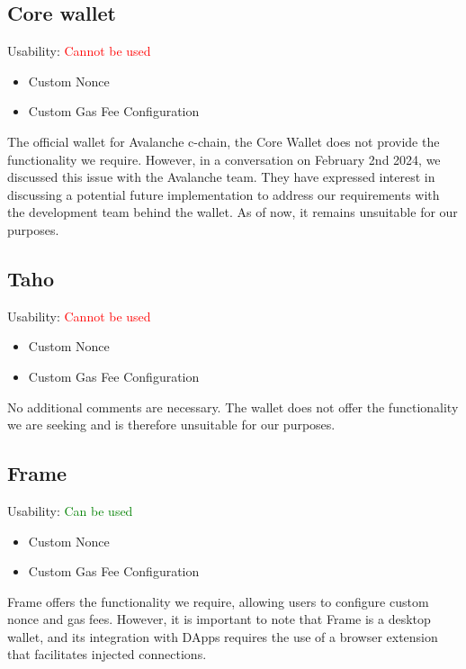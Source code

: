 \documentclass[fleqn,10pt]{olplainarticle}
\newcommand{\cmark}{\ding{51}}%
\newcommand{\xmark}{\ding{55}}%
\begin{document}
\subsection{Core wallet}
Usability: \textcolor{red}{Cannot be used}
\begin{itemize}[noitemsep, nolistsep]
	\item [\textcolor{red}{\xmark}] Custom Nonce
	\item [\textcolor{red}{\xmark}] Custom Gas Fee Configuration
\end{itemize}
The official wallet for Avalanche c-chain, the Core Wallet does not provide the functionality we require. However, in a conversation on February 2nd 2024, we discussed this issue with the Avalanche team. They have expressed interest in discussing a potential future implementation to address our requirements with the development team behind the wallet. As of now, it remains unsuitable for our purposes.

\subsection{Taho}
Usability: \textcolor{red}{Cannot be used}
\begin{itemize}[noitemsep, nolistsep]
	\item [\textcolor{red}{\xmark}] Custom Nonce
	\item [\textcolor{red}{\xmark}] Custom Gas Fee Configuration
\end{itemize}
No additional comments are necessary. The wallet does not offer the functionality we are seeking and is therefore unsuitable for our purposes.

\subsection{Frame}
Usability: \textcolor{green}{Can be used}
\begin{itemize}[noitemsep, nolistsep]
	\item [\textcolor{green}{\cmark}] Custom Nonce
	\item [\textcolor{green}{\cmark}] Custom Gas Fee Configuration
\end{itemize}
Frame offers the functionality we require, allowing users to configure custom nonce and gas fees. However, it is important to note that Frame is a desktop wallet, and its integration with DApps requires the use of a browser extension that facilitates injected connections.
\end{document}
